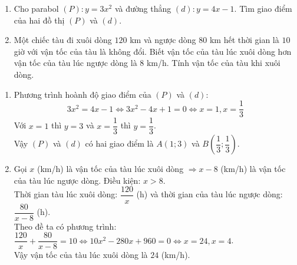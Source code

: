 \begin{ex}%
\hfill
    \begin{enumerate}
        \item Cho parabol $(P): y=3x^2$ và đường thẳng $(d): y=4x-1$. Tìm giao điểm của hai đồ thị $(P)$ và $(d)$.
        \item Một chiếc tàu đi xuôi dòng $120$ km và ngược dòng $80$ km hết thời gian là $10$ giờ với vận tốc của tàu là không đổi. Biết vận tốc của tàu lúc xuôi dòng hơn vận tốc của tàu lúc ngược dòng là $8$ km/h. Tính vận tốc của tàu khi xuôi dòng.
    \end{enumerate}
\loigiai
    {
    \begin{enumerate}
        \item Phương trình hoành độ giao điểm của $(P)$ và $(d)$:
$$ 3x^2=4x-1\Leftrightarrow 3x^2-4x+1=0\Leftrightarrow x=1, x=\frac{1}{3} $$
Với $x=1$ thì $y=3$ và $x=\dfrac{1}{3}$ thì $y=\dfrac{1}{3}$.\\
Vậy $(P)$ và $(d)$ có hai giao điểm là $A(1;3)$ và $B\left(\dfrac{1}{3};\dfrac{1}{3}\right)$.
        \item Gọi $x$ (km/h) là vận tốc của tàu lúc xuôi dòng $\Rightarrow x-8$ (km/h) là vận tốc của tàu lúc ngược dòng. Điều kiện: $x>8$.\\
Thời gian tàu lúc xuôi dòng: $\dfrac{120}{x}$ (h) và thời gian của tàu lúc ngược dòng: $\dfrac{80}{x-8}$ (h).\\Theo đề ta có phương trình: $\dfrac{120}{x}+\dfrac{80}{x-8}=10\Leftrightarrow 10x^2-280x+960=0\Leftrightarrow x=24, x=4$.\\
Vậy vận tốc của tàu lúc xuôi dòng là $24$ (km/h).
    \end{enumerate}
    }
\end{ex}

